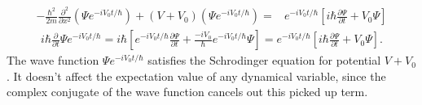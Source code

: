 \begin{align*}
    -\frac{\hbar^2}{2m}\frac{\partial^2}{\partial x^2}(\Psi e^{-iV_0t/\hbar}) + 
    (V+V_0)(\Psi e^{-iV_0t/\hbar}) = & e^{-iV_0t/\hbar}
    \left[i\hbar\frac{\partial\Psi}{\partial t} + V_0\Psi\right]
\end{align*}
\begin{align*}
    i\hbar\frac{\partial}{\partial t}\Psi e^{-iV_0t/\hbar}
    =i\hbar\left[
    e^{-iV_0t/\hbar}\frac{\partial \Psi}{\partial t} + 
    \frac{-iV_0}{\hbar} e^{-iV_0t/\hbar}\Psi\right]
    = 
 e^{-iV_0t/\hbar}
    \left[i\hbar\frac{\partial\Psi}{\partial t} + V_0\Psi\right].
\end{align*}
The wave function $\Psi e^{-iV_0t/\hbar}$ satisfies the 
Schrodinger equation for potential $V+V_0$. It doesn't affect the expectation value of any dynamical variable, since the complex conjugate of the wave function cancels out this picked up term.


